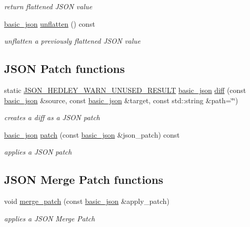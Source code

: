 \begin{DoxyCompactItemize}
\begin{DoxyCompactList}\small\item\em return flattened J\+S\+ON value \end{DoxyCompactList}\item 
\hyperlink{classnlohmann_1_1basic__json}{basic\+\_\+json} \hyperlink{classnlohmann_1_1basic__json_a8276b7a575ab680644d4de047d08505c}{unflatten} () const 
\begin{DoxyCompactList}\small\item\em unflatten a previously flattened J\+S\+ON value \end{DoxyCompactList}\end{DoxyCompactItemize}
\subsection*{J\+S\+ON Patch functions}
\begin{DoxyCompactItemize}
\item 
static \hyperlink{json_8hpp_a28d7e3b2d26bd5b8a3806da3db7dea03}{J\+S\+O\+N\+\_\+\+H\+E\+D\+L\+E\+Y\+\_\+\+W\+A\+R\+N\+\_\+\+U\+N\+U\+S\+E\+D\+\_\+\+R\+E\+S\+U\+LT} \hyperlink{classnlohmann_1_1basic__json}{basic\+\_\+json} \hyperlink{classnlohmann_1_1basic__json_a1c1f21327df91a4dd6c5f5a107240385}{diff} (const \hyperlink{classnlohmann_1_1basic__json}{basic\+\_\+json} \&source, const \hyperlink{classnlohmann_1_1basic__json}{basic\+\_\+json} \&target, const std\+::string \&path=\char`\"{}\char`\"{})
\begin{DoxyCompactList}\small\item\em creates a diff as a J\+S\+ON patch \end{DoxyCompactList}\item 
\hyperlink{classnlohmann_1_1basic__json}{basic\+\_\+json} \hyperlink{classnlohmann_1_1basic__json_a9c2abd53796bb301f57185e0a81b352a}{patch} (const \hyperlink{classnlohmann_1_1basic__json}{basic\+\_\+json} \&json\+\_\+patch) const 
\begin{DoxyCompactList}\small\item\em applies a J\+S\+ON patch \end{DoxyCompactList}\end{DoxyCompactItemize}
\subsection*{J\+S\+ON Merge Patch functions}
\begin{DoxyCompactItemize}
\item 
void \hyperlink{classnlohmann_1_1basic__json_a844a77cb154752d12118f10af26d54cb}{merge\+\_\+patch} (const \hyperlink{classnlohmann_1_1basic__json}{basic\+\_\+json} \&apply\+\_\+patch)
\begin{DoxyCompactList}\small\item\em applies a J\+S\+ON Merge Patch \end{DoxyCompactList}\end{DoxyCompactItemize}



